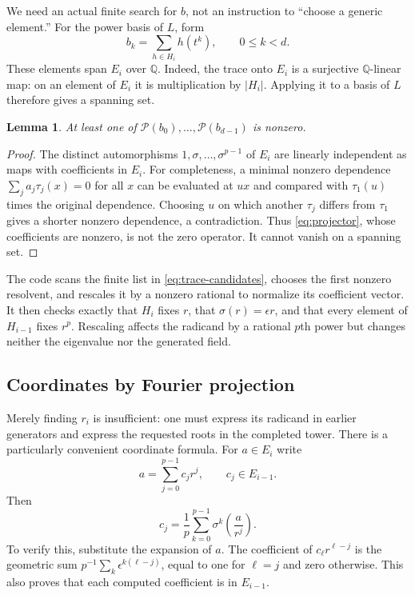 \documentclass[11pt,a4paper]{article}
\newtheorem{lemma}[theorem]{Lemma}
\theoremstyle{definition}
\theoremstyle{remark}
\newcommand{\Q}{\mathbb Q}
\begin{document}
We need an actual finite search for $b$, not an instruction to ``choose a
generic element.'' For the power basis of $L$, form
\begin{equation}\label{eq:trace-candidates}
 b_k=\sum_{h\in H_i}h(t^k),\qquad 0\leq k<d.
\end{equation}
These elements span $E_i$ over $\Q$. Indeed, the trace onto $E_i$ is a
surjective $\Q$-linear map: on an element of $E_i$ it is multiplication by
$|H_i|$. Applying it to a basis of $L$ therefore gives a spanning set.

\begin{lemma}\label{lem:nonzero}
At least one of $\mathcal P(b_0),\ldots,\mathcal P(b_{d-1})$ is nonzero.
\end{lemma}
\begin{proof}
The distinct automorphisms $1,\sigma,\ldots,\sigma^{p-1}$ of $E_i$ are linearly
independent as maps with coefficients in $E_i$. For completeness, a minimal
nonzero dependence $\sum_j a_j\tau_j(x)=0$ for all $x$ can be evaluated at $ux$
and compared with $\tau_1(u)$ times the original dependence. Choosing $u$ on
which another $\tau_j$ differs from $\tau_1$ gives a shorter nonzero
dependence, a contradiction. Thus \eqref{eq:projector}, whose coefficients are
nonzero, is not the zero operator. It cannot vanish on a spanning set.
\end{proof}

The code scans the finite list in \eqref{eq:trace-candidates}, chooses the first
nonzero resolvent, and rescales it by a nonzero rational to normalize its
coefficient vector. It then checks exactly that $H_i$ fixes $r$, that
$\sigma(r)=\epsilon r$, and that every element of $H_{i-1}$ fixes $r^p$.
Rescaling affects the radicand by a rational $p$th power but changes neither
the eigenvalue nor the generated field.

\subsection{Coordinates by Fourier projection}
Merely finding $r_i$ is insufficient: one must express its radicand in earlier
generators and express the requested roots in the completed tower. There is a
particularly convenient coordinate formula. For $a\in E_i$ write
\[
 a=\sum_{j=0}^{p-1}c_jr^j,\qquad c_j\in E_{i-1}.
\]
Then
\begin{equation}\label{eq:coordinates}
 c_j=\frac1p\sum_{k=0}^{p-1}\sigma^k\!\left(\frac{a}{r^j}\right).
\end{equation}
To verify this, substitute the expansion of $a$. The coefficient of
$c_\ell r^{\ell-j}$ is the geometric sum
$p^{-1}\sum_k\epsilon^{k(\ell-j)}$, equal to one for $\ell=j$ and zero otherwise.
This also proves that each computed coefficient is in $E_{i-1}$.
\end{document}
